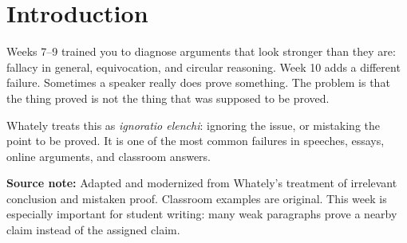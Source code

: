 \documentclass[12pt]{article}
\newcommand{\focusbox}[1]{\par\vspace{0.4em}\noindent\begingroup\setlength{\fboxsep}{6pt}\colorbox{gray!12}{\begin{minipage}{\dimexpr\linewidth-2\fboxsep\relax}#1\end{minipage}}\endgroup\par\vspace{0.5em}}
\begin{document}
\section*{Introduction}
Weeks 7--9 trained you to diagnose arguments that look stronger than they are: fallacy in general, equivocation, and circular reasoning. Week 10 adds a different failure. Sometimes a speaker really does prove something. The problem is that the thing proved is not the thing that was supposed to be proved.

Whately treats this as \textit{ignoratio elenchi}: ignoring the issue, or mistaking the point to be proved. It is one of the most common failures in speeches, essays, online arguments, and classroom answers.

\focusbox{\textbf{Source note:} Adapted and modernized from Whately's treatment of irrelevant conclusion and mistaken proof. Classroom examples are original. This week is especially important for student writing: many weak paragraphs prove a nearby claim instead of the assigned claim.}
\end{document}
